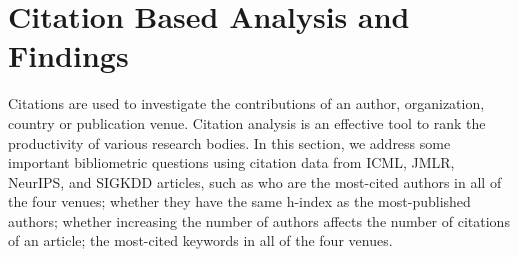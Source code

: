 \section{Citation Based Analysis and Findings}
\label{sec:citation}

Citations are used to investigate the contributions of an author, organization, country or publication venue. Citation analysis is an effective tool to rank the productivity of various research bodies. In this section, we address some important bibliometric questions using citation data from ICML, JMLR, NeurIPS, and SIGKDD articles, such as who are the most-cited authors in all of the four venues; whether they have the same h-index as the most-published authors; whether increasing the number of authors affects the number of citations of an article; the most-cited keywords in all of the four venues.


